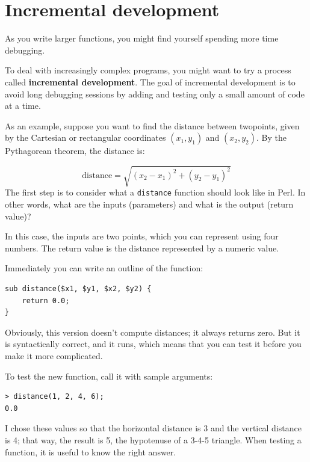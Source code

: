 \section{Incremental development}
\label{incremental.development}

As you write larger functions, you might find yourself
spending more time debugging.

To deal with increasingly complex programs,
you might want to try a process called
{\bf incremental development}.  The goal of incremental development
is to avoid long debugging sessions by adding and testing only
a small amount of code at a time.

As an example, suppose you want to find the distance between 
twopoints, given by the Cartesian or rectangular coordinates 
$(x_1, y_1)$ and $(x_2, y_2)$. By the Pythagorean theorem, 
the distance is:


\begin{displaymath}
\mathrm{distance} = \sqrt{(x_2 - x_1)^2 + (y_2 - y_1)^2}
\end{displaymath}
%
The first step is to consider what a {\tt distance} function should
look like in Perl.  In other words, what are the inputs (parameters)
and what is the output (return value)?

In this case, the inputs are two points, which you can represent
using four numbers.  The return value is the distance represented by
a numeric value.

Immediately you can write an outline of the function:

\begin{verbatim}
sub distance($x1, $y1, $x2, $y2) {
    return 0.0;
}
\end{verbatim}
%
Obviously, this version doesn't compute distances; it always returns
zero.  But it is syntactically correct, and it runs, which means that
you can test it before you make it more complicated.

To test the new function, call it with sample arguments:

\begin{verbatim}
> distance(1, 2, 4, 6);
0.0
\end{verbatim}
%
I chose these values so that the horizontal distance is 3 and the
vertical distance is 4; that way, the result is 5, the hypotenuse 
of a 3-4-5 triangle. When testing a function, it is
useful to know the right answer.

